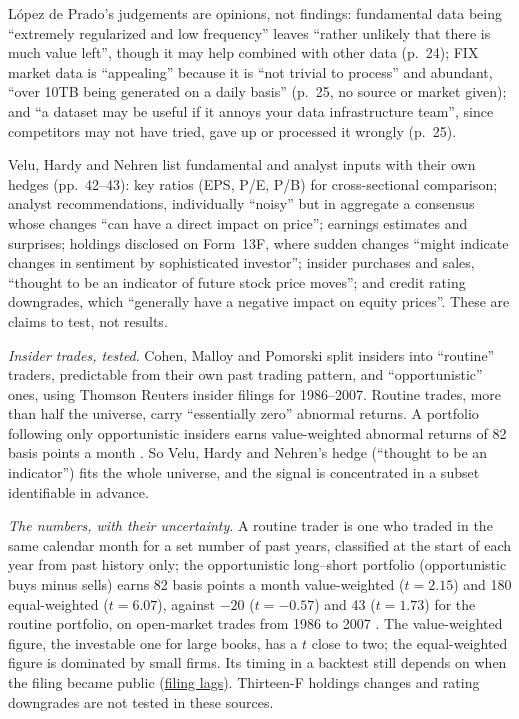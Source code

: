\begin{qfdefinition}
 López de Prado's judgements are opinions, not findings: fundamental data being ``extremely regularized and low frequency'' leaves ``rather unlikely that there is much value left'', though it may help combined with other data (p.~24); FIX market data is ``appealing'' because it is ``not trivial to process'' and abundant, ``over 10TB being generated on a daily basis'' (p.~25, no source or market given); and ``a dataset may be useful if it annoys your data infrastructure team'', since competitors may not have tried, gave up or processed it wrongly (p.~25).

Velu, Hardy and Nehren list fundamental and analyst inputs with their own hedges (pp.~42--43): key ratios (EPS, P/E, P/B) for cross-sectional comparison; analyst recommendations, individually ``noisy'' but in aggregate a consensus whose changes ``can have a direct impact on price''; earnings estimates and surprises; holdings disclosed on Form~13F, where sudden changes ``might indicate changes in sentiment by sophisticated investor''; insider purchases and sales, ``thought to be an indicator of future stock price moves''; and credit rating downgrades, which ``generally have a negative impact on equity prices''. These are claims to test, not results.

\emph{Insider trades, tested}. Cohen, Malloy and Pomorski split insiders into ``routine'' traders, predictable from their own past trading pattern, and ``opportunistic'' ones, using Thomson Reuters insider filings for 1986--2007. Routine trades, more than half the universe, carry ``essentially zero'' abnormal returns. A portfolio following only opportunistic insiders earns value-weighted abnormal returns of 82 basis points a month \citep[working-paper version, abstract and introduction, pp.~5--6]{eq-cohen-malloy-pomorski-2012}. So Velu, Hardy and Nehren's hedge (``thought to be an indicator'') fits the whole universe, and the signal is concentrated in a subset identifiable in advance.

\emph{The numbers, with their uncertainty}. A routine trader is one who traded in the same calendar month for a set number of past years, classified at the start of each year from past history only; the opportunistic long--short portfolio (opportunistic buys minus sells) earns 82 basis points a month value-weighted ($t=2.15$) and 180 equal-weighted ($t=6.07$), against $-20$ ($t=-0.57$) and 43 ($t=1.73$) for the routine portfolio, on open-market trades from 1986 to 2007 \citep[NBER WP~16454, sec.~I, PDF p.~7]{eq-cohen-malloy-pomorski-2012}. The value-weighted figure, the investable one for large books, has a $t$ close to two; the equal-weighted figure is dominated by small firms. Its timing in a backtest still depends on when the filing became public (\hyperref[data:holdings-insider-filing-lags]{filing lags}). Thirteen-F holdings changes and rating downgrades are not tested in these sources.


\end{qfdefinition}
